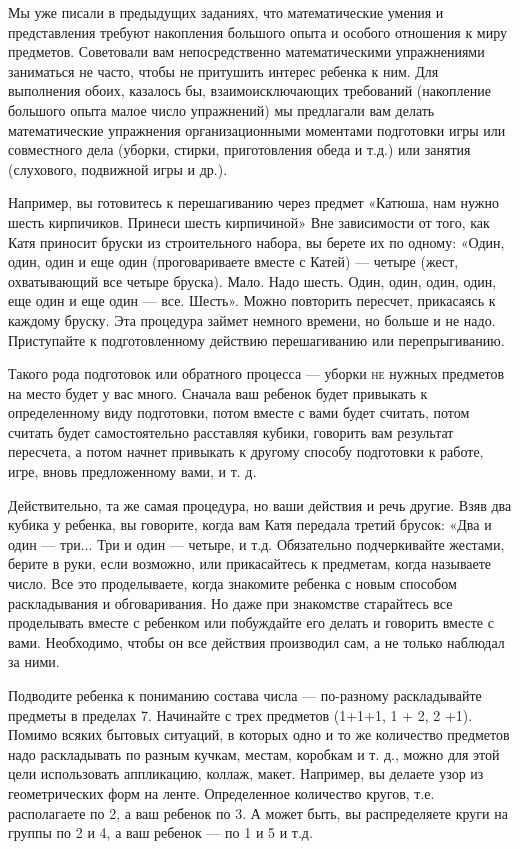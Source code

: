 \documentclass[a5paper]{book}
\begin{document}
Мы уже писали в предыдущих заданиях, что математические умения и
представления требуют накопления большого опыта и особого отношения к
миру предметов. Советовали вам непосредственно математическими
упражнениями заниматься не часто, чтобы не притушить интерес ребенка к
ним. Для выполнения обоих, казалось бы, взаимоисключающих требований
(накопление большого опыта малое число упражнений) мы предлагали вам
делать математические упражнения организационными моментами подготовки
игры или совместного дела (уборки, стирки, приготовления обеда и т.д.)
или занятия (слухового, подвижной игры и др.).

Например, вы готовитесь к перешагиванию через предмет «Катюша, нам нужно
шесть кирпичиков. Принеси шесть кирпичиной» Вне зависимости от того, как
Катя приносит бруски из строительного набора, вы берете их по одному:
«Один, один, один и еще один (проговариваете вместе с Катей) --- четыре
(жест, охватывающий все четыре бруска). Мало. Надо шесть. Один, один,
один, один, еще один и еще один --- все. Шесть». Можно повторить
пересчет, прикасаясь к каждому бруску. Эта процедура займет немного
времени, но больше и не надо. Приступайте к подготовленному действию
перешагиванию или перепрыгиванию.

Такого рода подготовок или обратного процесса --- уборки \textsc{не}
нужных предметов на место будет у вас много. Сначала ваш ребенок будет
привыкать к определенному виду подготовки, потом вместе с вами будет
считать, потом считать будет самостоятельно расставляя кубики, говорить
вам результат пересчета, а потом начнет привыкать к другому способу
подготовки к работе, игре, вновь предложенному вами, и т. д.

Действительно, та же самая процедура, но ваши действия и речь другие.
Взяв два кубика у ребенка, вы говорите, когда вам Катя передала третий
брусок: «Два и один --- три... Три и один --- четыре, и т.д. Обязательно
подчеркивайте жестами, берите в руки, если возможно, или прикасайтесь к
предметам, когда называете число. Все это проделываете, когда знакомите
ребенка с новым способом раскладывания и обговаривания. Но даже при
знакомстве старайтесь все проделывать вместе с ребенком или побуждайте
его делать и говорить вместе с вами. Необходимо, чтобы он все действия
производил сам, а не только наблюдал за ними.

Подводите ребенка к пониманию состава числа --- по-разному раскладывайте
предметы в пределах 7. Начинайте с трех предметов (1+1+1, 1 + 2, 2 +1).
Помимо всяких бытовых ситуаций, в которых одно и то же количество
предметов надо раскладывать по разным кучкам, местам, коробкам и т. д.,
можно для этой цели использовать аппликацию, коллаж, макет. Например, вы
делаете узор из геометрических форм на ленте. Определенное количество
кругов, т.е. располагаете по 2, а ваш ребенок по 3. А может быть, вы
распределяете круги на группы по 2 и 4, а ваш ребенок --- по 1 и 5 и
т.д.
\end{document}
